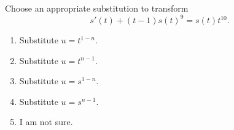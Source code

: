 \documentclass[t, 14pt]{beamer}
\begin{document}
\begin{frame}[t]
  Choose an appropriate substitution to transform
  \[
    s'(t) + (t-1)s(t)^{9} = s(t) t^{10}.
  \]

  \begin{enumerate} 
    \item Substitute \(u = t^{1-n}\).
    \item Substitute \(u = t^{n-1}\).
    \item Substitute \(u = s^{1-n}\).
    \item Substitute \(u = s^{n-1}\).
    \item I am not sure.
  \end{enumerate} 
\end{frame}
\end{document}
